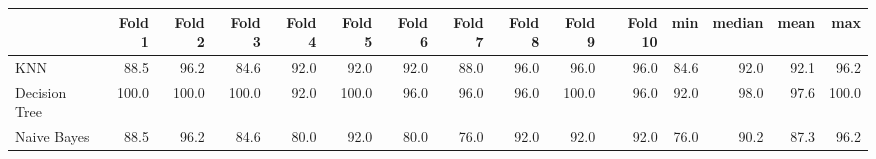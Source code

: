 \begin{tabular}{lrrrrrrrrrrrrrr}
\toprule
{} & Fold 1 & Fold 2 & Fold 3 & Fold 4 & Fold 5 & Fold 6 & Fold 7 & Fold 8 & Fold 9 & Fold 10 &   min & median &  mean &    max \\
\midrule
KNN           & 88.5 & 96.2 & 84.6 & 92.0 & 92.0 & 92.0 & 88.0 & 96.0 & 96.0 & 96.0 & 84.6 & 92.0 & 92.1 & 96.2 \\
Decision Tree & 100.0 & 100.0 & 100.0 & 92.0 & 100.0 & 96.0 & 96.0 & 96.0 & 100.0 & 96.0 & 92.0 & 98.0 & 97.6 & 100.0 \\
Naive Bayes   & 88.5 & 96.2 & 84.6 & 80.0 & 92.0 & 80.0 & 76.0 & 92.0 & 92.0 & 92.0 & 76.0 & 90.2 & 87.3 & 96.2 \\
\bottomrule
\end{tabular}
